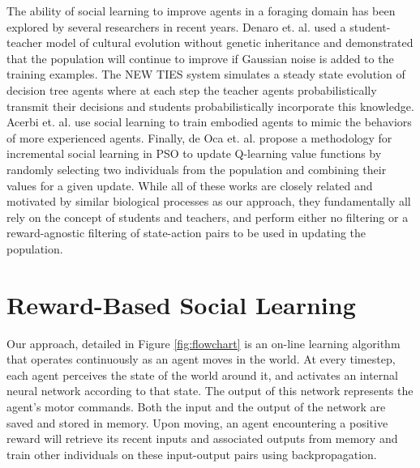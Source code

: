 \documentclass{acm_proc_article-sp}
\begin{document}
The ability of social learning to improve agents in a foraging domain has been explored by several researchers in recent years. Denaro et. al. \cite{denaro1996cultural} used a student-teacher model of cultural evolution without genetic inheritance and demonstrated that the population will continue to improve if Gaussian noise is added to the training examples. The NEW TIES system \cite{haasdijk2008social, vogt2010modeling} simulates a steady state evolution of decision tree agents where at each step the teacher agents probabilistically transmit their decisions and students probabilistically incorporate this knowledge. Acerbi et. al. \cite{acerbi2007social} use social learning to train embodied agents to mimic the behaviors of more experienced agents. Finally, de Oca et. al. \cite{de2011incremental} propose a methodology for incremental social learning in PSO to update Q-learning \cite{watkins1992q} value functions by randomly selecting two individuals from the population and combining their values for a given update. While all of these works are closely related and motivated by similar biological processes as our approach, they fundamentally all rely on the concept of students and teachers, and perform either no filtering or a reward-agnostic filtering of state-action pairs to be used in updating the population.


\section{Reward-Based Social Learning}
\label{sec:rbsl}

Our approach, detailed in Figure \ref{fig:flowchart} is an on-line learning algorithm that operates continuously as an agent moves in the world. At every timestep, each agent perceives the state of the world around it, and activates an internal neural network according to that state. The output of this network represents the agent's motor commands. Both the input and the output of the network are saved and stored in memory. Upon moving, an agent encountering a positive reward will retrieve its recent inputs and associated outputs from memory and train other individuals on these input-output pairs using backpropagation.
\end{document}
